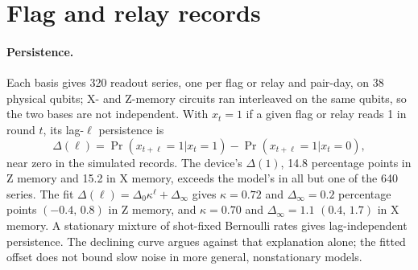 \documentclass[aps,pra,reprint,nofootinbib,longbibliography,floatfix,showkeys]{revtex4-2}
\newcommand{\ci}[2]{\ensuremath{(#1,\,#2)}}
\begin{document}
\section{Flag and relay records}
\label{app:flags}

\paragraph*{Persistence.}
Each basis gives 320 readout series, one per flag or relay and pair-day, on 38 physical qubits; X- and Z-memory circuits ran interleaved on the same qubits, so the two bases are not independent.
With $x_t = 1$ if a given flag or relay reads 1 in round $t$, its lag-$\ell$ persistence is
\begin{equation}
\Delta(\ell) = \Pr(x_{t+\ell}{=}1|x_t{=}1) - \Pr(x_{t+\ell}{=}1|x_t{=}0) ,
\label{eq:refire}
\end{equation}
near zero in the simulated records.
The device's $\Delta(1)$, 14.8 percentage points in Z memory and 15.2 in X memory, exceeds the model's in all but one of the 640 series.
The fit $\Delta(\ell) = \Delta_0\kappa^\ell + \Delta_\infty$ gives $\kappa = 0.72$ and $\Delta_\infty = 0.2$ percentage points \ci{-0.4}{0.8} in Z memory, and $\kappa = 0.70$ and $\Delta_\infty = 1.1$ \ci{0.4}{1.7} in X memory.
A stationary mixture of shot-fixed Bernoulli rates gives lag-independent persistence.
The declining curve argues against that explanation alone; the fitted offset does not bound slow noise in more general, nonstationary models.
\end{document}
